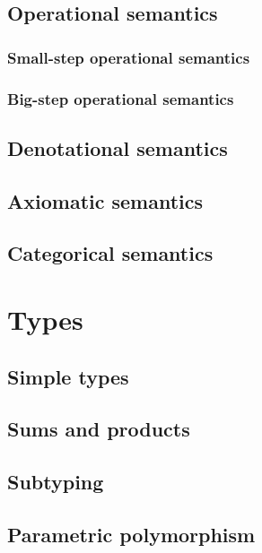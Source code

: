 \documentclass[ebook,oneside]{memoir} %
\begin{document}
      \chapter{Operational semantics}

        \section{Small-step operational semantics}

        \section{Big-step operational semantics}

      \chapter{Denotational semantics}

      \chapter{Axiomatic semantics}

      \chapter{Categorical semantics}

    \part{Types}

      \chapter{Simple types}

      \chapter{Sums and products}

      \chapter{Subtyping}

      \chapter{Parametric polymorphism}
\end{document}
